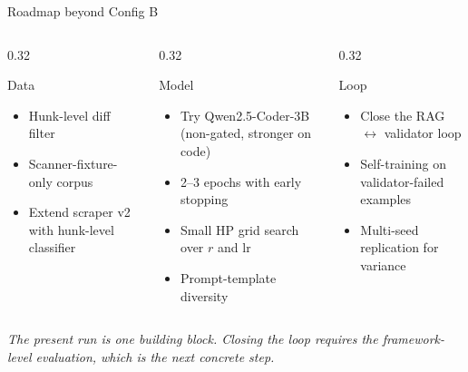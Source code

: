 \documentclass[aspectratio=169, 10pt]{beamer}
\begin{document}
\begin{frame}{Roadmap beyond Config B}
  \begin{columns}[T]
    \begin{column}{0.32\textwidth}
      \begin{block}{Data}
        \scriptsize
        \begin{itemize}
          \item Hunk-level diff filter
          \item Scanner-fixture-only corpus
          \item Extend scraper v2 with hunk-level classifier
        \end{itemize}
      \end{block}
    \end{column}
    \begin{column}{0.32\textwidth}
      \begin{block}{Model}
        \scriptsize
        \begin{itemize}
          \item Try Qwen2.5-Coder-3B (non-gated, stronger on code)
          \item 2--3 epochs with early stopping
          \item Small HP grid search over $r$ and lr
          \item Prompt-template diversity
        \end{itemize}
      \end{block}
    \end{column}
    \begin{column}{0.32\textwidth}
      \begin{block}{Loop}
        \scriptsize
        \begin{itemize}
          \item Close the RAG $\leftrightarrow$ validator loop
          \item Self-training on validator-failed examples
          \item Multi-seed replication for variance
        \end{itemize}
      \end{block}
    \end{column}
  \end{columns}
  \vspace{0.4em}
  \begin{center}
    \scriptsize\color{sfaxblue}\itshape
    The present run is one building block. Closing the loop requires the
    framework-level evaluation, which is the next concrete step.
  \end{center}
\end{frame}
\end{document}
